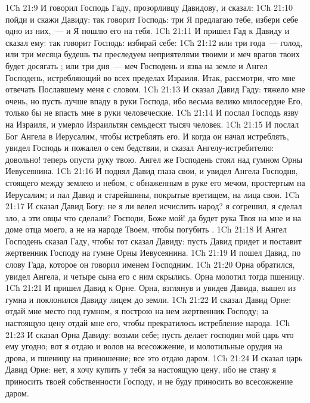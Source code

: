 \vs 1Ch 21:9 И говорил Господь Гаду, прозорливцу Давидову, и сказал:
\vs 1Ch 21:10 пойди и скажи Давиду: так говорит Господь: три  Я предлагаю тебе, избери себе одно из них,~--- и Я пошлю его на тебя.
\vs 1Ch 21:11 И пришел Гад к Давиду и сказал ему: так говорит Господь: избирай себе:
\vs 1Ch 21:12 или три года~--- голод, или три месяца будешь ты преследуем неприятелями твоими и меч врагов твоих будет досягать ; или три дня~--- меч Господень и язва на земле и Ангел Господень, истребляющий во всех пределах Израиля. Итак, рассмотри, что мне отвечать Пославшему меня с словом.
\vs 1Ch 21:13 И сказал Давид Гаду: тяжело мне очень, но пусть лучше впаду в руки Господа, ибо весьма велико милосердие Его, только бы не впасть мне в руки человеческие.
\vs 1Ch 21:14 И послал Господь язву на Израиля, и умерло Израильтян семьдесят тысяч человек.
\vs 1Ch 21:15 И послал Бог Ангела в Иерусалим, чтобы истреблять его. И когда он начал истреблять, увидел Господь и пожалел о сем бедствии, и сказал Ангелу-истребителю: довольно! теперь опусти руку твою. Ангел же Господень стоял  над гумном Орны Иевусеянина.
\vs 1Ch 21:16 И поднял Давид глаза свои, и увидел Ангела Господня, стоящего между землею и небом, с обнаженным в руке его мечом, простертым на Иерусалим; и пал Давид и старейшины, покрытые вретищем, на лица свои.
\vs 1Ch 21:17 И сказал Давид Богу: не я ли велел исчислить народ? я согрешил, я сделал зло, а эти овцы что сделали? Господи, Боже мой! да будет рука Твоя на мне и на доме отца моего, а не на народе Твоем, чтобы погубить .
\vs 1Ch 21:18 И Ангел Господень сказал Гаду, чтобы тот сказал Давиду: пусть Давид придет и поставит жертвенник Господу на гумне Орны Иевусеянина.
\rsbpar\vs 1Ch 21:19 И пошел Давид, по слову Гада, которое он говорил именем Господним.
\vs 1Ch 21:20 Орна обратился, увидел Ангела, и четыре сына его с ним скрылись. Орна молотил тогда пшеницу.
\vs 1Ch 21:21 И пришел Давид к Орне. Орна, взглянув и увидев Давида, вышел из гумна и поклонился Давиду лицем до земли.
\vs 1Ch 21:22 И сказал Давид Орне: отдай мне место под гумном, я построю на нем жертвенник Господу; за настоящую цену отдай мне его, чтобы прекратилось истребление народа.
\vs 1Ch 21:23 И сказал Орна Давиду: возьми себе; пусть делает господин мой царь что ему угодно; вот я отдаю и волов на всесожжение, и молотильные орудия на дрова, и пшеницу на приношение; все это отдаю даром.
\vs 1Ch 21:24 И сказал царь Давид Орне: нет, я хочу купить у тебя за настоящую цену, ибо не стану я приносить твоей собственности Господу, и не буду приносить во всесожжение  даром.
